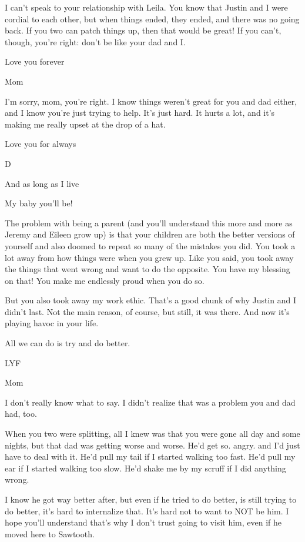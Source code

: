 I can't speak to your relationship with Leila. You know that Justin and I were cordial to each other, but when things ended, they ended, and there was no going back. If you two can patch things up, then that would be great! If you can't, though, you're right: don't be like your dad and I.

Love you forever

Mom

\secdiv{}

I'm sorry, mom, you're right. I know things weren't great for you and dad either, and I know you're just trying to help. It's just hard. It hurts a lot, and it's making me really upset at the drop of a hat.

Love you for always

D

\secdiv{}

And as long as I live

My baby you'll be!

The problem with being a parent (and you'll understand this more and more as Jeremy and Eileen grow up) is that your children are both the better versions of yourself and also doomed to repeat so many of the mistakes you did. You took a lot away from how things were when you grew up. Like you said, you took away the things that went wrong and want to do the opposite. You have my blessing on that! You make me endlessly proud when you do so.

But you also took away my work ethic. That's a good chunk of why Justin and I didn't last. Not the main reason, of course, but still, it was there. And now it's playing havoc in your life.

All we can do is try and do better.

LYF

Mom

\secdiv{}

I don't really know what to say. I didn't realize that was a problem you and dad had, too.

When you two were splitting, all I knew was that you were gone all day and some nights, but that dad was getting worse and worse. He'd get so. angry. and I'd just have to deal with it. He'd pull my tail if I started walking too fast. He'd pull my ear if I started walking too slow. He'd shake me by my scruff if I did anything wrong.

I know he got way better after, but even if he tried to do better, is still trying to do better, it's hard to internalize that. It's hard not to want to NOT be him. I hope you'll understand that's why I don't trust going to visit him, even if he moved here to Sawtooth.

